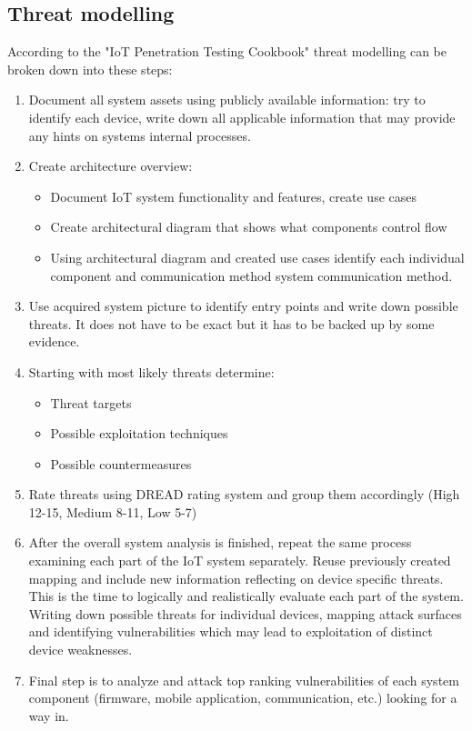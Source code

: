 \subsection{Threat modelling}
According to the "IoT Penetration Testing Cookbook"\cite{cookbook} threat modelling can be broken down into these steps:
\begin{enumerate}
    \item Document all system assets using publicly available information: try to identify each device, write down all applicable information that may provide any hints on systems internal processes.
    \item Create architecture overview:
    \begin{itemize}
         \item Document IoT system functionality and features, create use cases
         \item Create architectural diagram that shows what components control flow
         \item Using architectural diagram and created use cases identify each individual component and communication method system communication method.
    \end{itemize}
    \item Use acquired system picture to identify entry points and write down possible threats. It does not have to be exact but it has to be backed up by some evidence.
    \item Starting with most likely threats determine:
    \begin{itemize}
        \item Threat targets 
        \item Possible exploitation techniques
        \item Possible countermeasures
    \end{itemize}
    \item Rate threats using DREAD rating system\cite{dread} and group them accordingly (High 12-15, Medium 8-11, Low 5-7)
    \item After the overall system analysis is finished, repeat the same process examining each part of the IoT system separately. Reuse previously created mapping and include new information reflecting on device specific threats. This is the time to logically and realistically evaluate each part of the system.
    Writing down possible threats for individual devices, mapping attack surfaces and identifying vulnerabilities which may lead to exploitation of distinct device weaknesses.
    \item Final step is to analyze and attack top ranking vulnerabilities of each system component (firmware, mobile application, communication, etc.) looking for a way in.
\end{enumerate}


